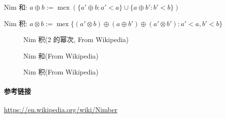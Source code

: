 Nim 和: \(a\oplus b:=\operatorname{mex}\left(\{a'\oplus b:a'<a\}\cup\{a\oplus b':b'<b\}\right)\)

Nim 积: \(a\otimes b:=\operatorname{mex}\{(a'\otimes b)\oplus(a\oplus b')\oplus(a'\otimes b'):a'<a,b'<b\}\)

\begin{figure}[h]
    \label{img:nim-prod-pow2}
    \centering
    
    \caption{Nim 积(2 的幂次, From Wikipedia)}
\end{figure}

\begin{figure}[h]
    \label{img:nim-add}
    \centering
    
    \caption{Nim 和(From Wikipedia)}
\end{figure}

\begin{figure}[h]
    \label{img:nim-prod}
    \centering
    
    \caption{Nim 积(From Wikipedia)}
\end{figure}

\paragraph{参考链接}

\url{https://en.wikipedia.org/wiki/Nimber}
